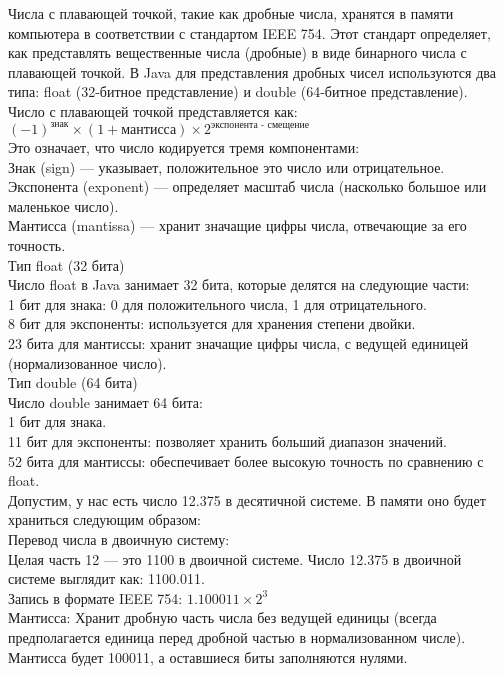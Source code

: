 Числа с плавающей точкой, такие как дробные числа, хранятся в памяти компьютера в соответствии с стандартом IEEE 754. Этот стандарт определяет, как представлять вещественные числа (дробные) в виде бинарного числа с плавающей точкой. В Java для представления дробных чисел используются два типа: float (32-битное представление) и double (64-битное представление). \\
Число с плавающей точкой представляется как: \\
$(-1)^{\text{знак}} \times (1 + \text{мантисса}) \times 2^{\text{экспонента - смещение}}$ \\
Это означает, что число кодируется тремя компонентами: \\
Знак (sign) — указывает, положительное это число или отрицательное. \\
Экспонента (exponent) — определяет масштаб числа (насколько большое или маленькое число). \\
Мантисса (mantissa) — хранит значащие цифры числа, отвечающие за его точность. \\
Тип float (32 бита) \\
Число float в Java занимает 32 бита, которые делятся на следующие части: \\
1 бит для знака: 0 для положительного числа, 1 для отрицательного. \\
8 бит для экспоненты: используется для хранения степени двойки. \\
23 бита для мантиссы: хранит значащие цифры числа, с ведущей единицей (нормализованное число). \\
Тип double (64 бита) \\
Число double занимает 64 бита: \\
1 бит для знака. \\
11 бит для экспоненты: позволяет хранить больший диапазон значений. \\
52 бита для мантиссы: обеспечивает более высокую точность по сравнению с float. \\
Допустим, у нас есть число 12.375 в десятичной системе. В памяти оно будет храниться следующим образом: \\
Перевод числа в двоичную систему: \\
Целая часть 12 — это 1100 в двоичной системе.
Число 12.375 в двоичной системе выглядит как: 1100.011. \\
Запись в формате IEEE 754: $1.100011 \times 2^3$  \\
Мантисса: Хранит дробную часть числа без ведущей единицы (всегда предполагается единица перед дробной частью в нормализованном числе). Мантисса будет 100011, а оставшиеся биты заполняются нулями. \\
